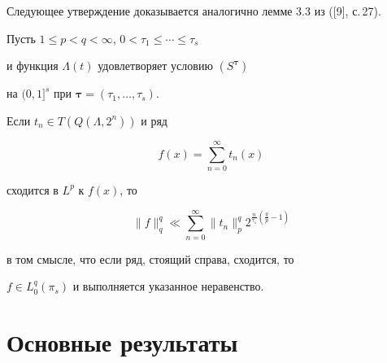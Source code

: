 Следующее утверждение доказывается аналогично лемме 3.3 из ([9], с.\,27).





\begin{lem}


Пусть $1\leq p< q < \infty$, $0<\tau_1\leq\dotsb \leq{\tau_s}$ 


и функция $\Lambda(t)$ удовлетворяет условию $(S^{\boldsymbol{\tau}})$ 


на $(0,1]^s$ при ${\boldsymbol{\tau}}=(\tau_1,\dotsc,\tau_s)$. 


Если $t_n\in T(Q(\Lambda,2^n))$ и ряд 


$$


f(x)=\sum_{n=0}^{\infty} t_n (x)


$$


сходится в $L^p$ к $f(x)$, то


$$


\|f\|^q_q \ll \sum_{n=0}^\infty \|t_n\|^q_p 2^{{\frac{n}{\tau_1}} 


({\frac{q}{p}}-1 )} 


$$


в том смысле, что если ряд, стоящий справа, сходится, то 


$f\in L_0^q(\pi _s)$ и выполняется указанное неравенство.


\end{lem}





\section{Основные результаты}





